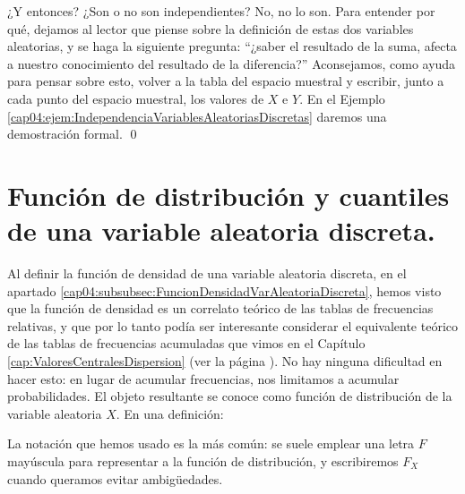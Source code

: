 \begin{Ejemplo}
¿Y entonces? ¿Son o no son independientes? No, no lo son. Para entender por qué, dejamos al lector que piense sobre la definición de estas dos variables aleatorias, y se haga la siguiente pregunta: ``¿saber el resultado de la suma, afecta a nuestro conocimiento del resultado de la diferencia?'' Aconsejamos, como ayuda para pensar  sobre esto, volver a la tabla del espacio muestral y escribir, junto a cada punto del espacio muestral, los valores de $X$ e $Y$. En el Ejemplo \ref{cap04:ejem:IndependenciaVariablesAleatoriasDiscretas} daremos una demostración formal.
\qed
\end{Ejemplo}


\section{Función de distribución y cuantiles de una variable aleatoria discreta.}
\label{cap04:sec:FuncionDistribucionVariableAleatoriaDiscreta}

Al definir la función de densidad de una variable aleatoria discreta, en el apartado \ref{cap04:subsubsec:FuncionDensidadVarAleatoriaDiscreta}, hemos visto que la función de densidad es un correlato teórico de las tablas de frecuencias relativas, y que por lo tanto podía ser interesante considerar el equivalente teórico de las tablas de frecuencias acumuladas que vimos en el Capítulo \ref{cap:ValoresCentralesDispersion} (ver la página \pageref{cap02:subsubsec:MedianaTablasFrecuenciasRelativasAcumuladas}).  No hay ninguna dificultad en hacer esto: en lugar de acumular frecuencias, nos limitamos a acumular probabilidades. El objeto resultante se conoce como {\sf función de distribución } de la variable aleatoria $X$. En una definición:
    \begin{center}
    \end{center}
La notación que hemos usado es la más común: se suele emplear una letra $F$ mayúscula para representar a la función de distribución, y escribiremos $F_X$ cuando queramos evitar ambigüedades.

